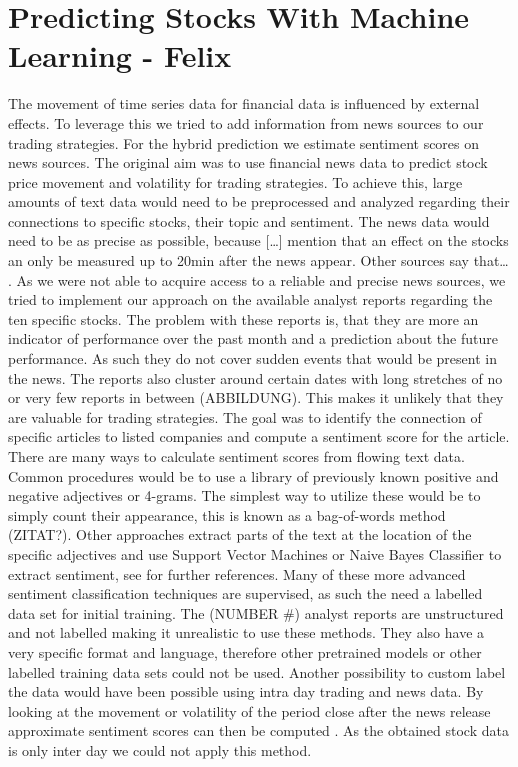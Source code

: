 \chapter{Predicting Stocks With Machine Learning - Felix} \label{ch:predictions_ml}
The movement of time series data for financial data is influenced by external effects. To leverage this we tried to add information from news sources to our trading strategies. For the hybrid prediction we estimate sentiment scores on news sources. The original aim was to use financial news data to predict stock price movement and volatility for trading strategies. To achieve this, large amounts of text data would need to be preprocessed and analyzed regarding their connections to specific stocks, their topic and sentiment. The news data would need to be as precise as possible, because […] mention that an effect on the stocks an only be measured up to 20min after the news appear. Other sources say that… .
%
As we were not able to acquire access to a reliable and precise news sources, we tried to implement our approach on the available analyst reports regarding the ten specific stocks. The problem with these reports is, that they are more an indicator of performance over the past month and a prediction about the future performance. As such they do not cover sudden events that would be present in the news. The reports also cluster around certain dates with long stretches of no or very few reports in between (ABBILDUNG). This makes it unlikely that they are valuable for trading strategies.
%
The goal was to identify the connection of specific articles to listed companies and compute a sentiment score for the article. There are many ways to calculate sentiment scores from flowing text data. Common procedures would be to use a library of previously known positive and negative adjectives or 4-grams. The simplest way to utilize these would be to simply count their appearance, this is known as a bag-of-words method (ZITAT?). Other approaches extract parts of the text at the location of the specific adjectives and use Support Vector Machines or Naive Bayes Classifier to extract sentiment, see \citet{westerski2007sentiment} for further references. Many of these more advanced sentiment classification techniques are supervised, as such the need a labelled data set for initial training. The (NUMBER \#) analyst reports are unstructured and not labelled making it unrealistic to use these methods. They also have a very specific format and language, therefore other pretrained models or other labelled training data sets could not be used. Another possibility to custom label the data would have been possible using intra day trading and news data. By looking at the movement or volatility of the period close after the news release approximate sentiment scores can then be computed \citep{robertson2007news}. As the obtained stock data is only inter day we could not apply this method.

